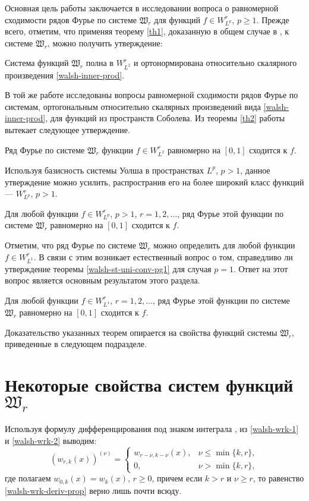 Основная цель работы заключается в исследовании вопроса о равномерной сходимости рядов Фурье по системе $\mathfrak{W}_r$ для функций $f \in W^r_{L^p}$, $p \ge 1$.
Прежде всего, отметим, что применяя теорему \ref{th1}, доказанную в общем случае в \cite{SharIzv2018}, к системе $\mathfrak{W}_r$, можно получить утверждение:
\begin{statement}
	Система функций $\mathfrak{W}_r$ полна в $W_{L^2}^r$ и ортонормирована относительно скалярного произведения \eqref{walsh-inner-prod}.
\end{statement}
В той же работе исследованы вопросы равномерной сходимости рядов Фурье по системам, ортогональным относительно скалярных произведений вида \eqref{walsh-inner-prod}, для функций из пространств Соболева. Из теоремы \ref{th2} работы \cite{SharIzv2018} вытекает следующее утверждение.
\begin{statement}
	Ряд Фурье по системе $\mathfrak{W}_r$ функции $f \in W_{L^2}^r$ равномерно на $[0,1]$ сходится к $f$.
\end{statement}



Используя базисность системы Уолша в пространствах $L^p$, $p>1$, данное утверждение можно усилить, распространив его на более широкий класс функций --- $W^r_{L^p}$, $p>1$.
\begin{theorem}\label{walsh-st-uni-conv-pg1}
	Для любой функции $f \in W_{L^p}^r$, $p>1$, $r=1,2,\ldots$, ряд Фурье этой функции по системе $\mathfrak{W}_r$ равномерно на $[0,1]$ сходится к $f$.
\end{theorem}

Отметим, что ряд Фурье по системе $\mathfrak{W}_r$ можно определить для любой функции $f \in W^r_{L^1}$. В связи с этим возникает естественный вопрос о том, справедливо ли утверждение теоремы \ref{walsh-st-uni-conv-pg1} для случая $p=1$. Ответ на этот вопрос является основным результатом этого раздела.
\begin{theorem}\label{walsh-st-main}
	Для любой функции $f \in W_{L^1}^r$, $r=1,2,\ldots$, ряд Фурье этой функции по системе $\mathfrak{W}_r$ равномерно на $[0,1]$ сходится к $f$.
\end{theorem}

Доказательство указанных теорем опирается на свойства функций системы $\mathfrak{W}_r$, приведенные в следующем подразделе.

\section{Некоторые свойства систем функций $\mathfrak{W}_r$}\label{walsh-sec-Wr-props}
Используя формулу дифференцирования под знаком интеграла \cite{rep2017-sobcheb_urav-fiht2}, из \eqref{walsh-wrk-1} и \eqref{walsh-wrk-2} выводим:
\begin{equation}\label{walsh-wrk-deriv-prop}
(w_{r,k}(x))^{(\nu)} =
\begin{cases}
w_{r-\nu,k-\nu}(x), &\nu \le \min\{k,r\},\\
0, &\nu > \min\{k,r\},
\end{cases}
\end{equation}
где полагаем $w_{0,k}(x)=w_{k}(x)$, $r \ge 0$, причем если $k > r$ и $\nu \ge r$, то равенство \eqref{walsh-wrk-deriv-prop} верно лишь почти всюду.

